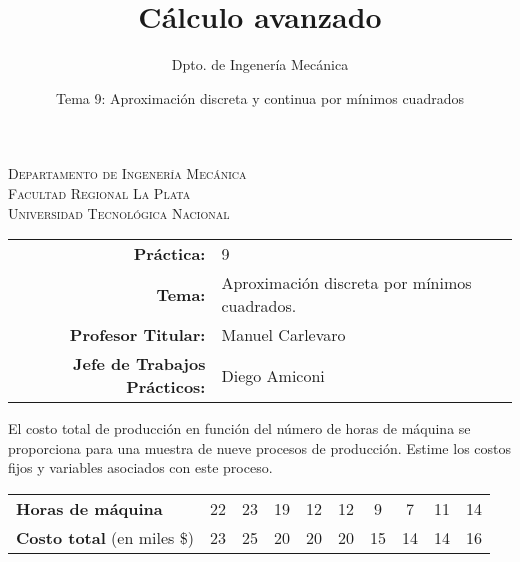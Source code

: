 \documentclass[11pt]{article}
\title{Cálculo avanzado}
\author{Dpto. de Ingenería Mecánica}
\date{Tema 9: Aproximación discreta y continua por mínimos cuadrados}
\begin{document}

\begin{center}
\end{center} 

\begin{center}
\vspace{\baselineskip}
\Large{\textsc{Departamento de Ingenería Mecánica}} \\
\textsc{Facultad Regional La Plata} \\
\textsc{Universidad Tecnológica Nacional}
\end{center}


\begin{center}
\begin{tabular}{r l}
    \textbf{Práctica:} & 9 \\
 \textbf{Tema:} & Aproximación discreta por mínimos cuadrados. \\
 \textbf{Profesor Titular:} & Manuel Carlevaro \\
 \textbf{Jefe de Trabajos Prácticos:} & Diego Amiconi \\
\end{tabular}\end{center}
\vspace{1em}

\begin{question} %
El costo total de producción en función del número de horas de máquina se proporciona para una muestra de nueve procesos de producción. Estime los costos fijos y variables asociados con este proceso.

\begin{center}
    \begin{tabular}{lccccccccc}
        \toprule
        \textbf{Horas de máquina} & 22 & 23 & 19 & 12 & 12 & 9 & 7 & 11 & 14 \\
        \textbf{Costo total} (en miles \$) & 23 & 25 & 20 & 20 & 20 & 15 & 14 & 14 & 16 \\
        \bottomrule
    \end{tabular}
\end{center}
\end{question}
\end{document}
